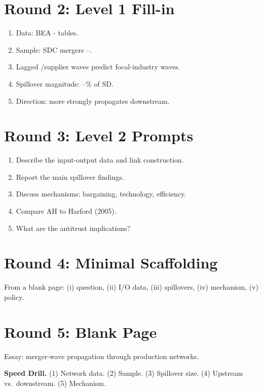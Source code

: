 \documentclass[11pt]{article}
\newcommand{\blank}[1]{\underline{\hspace{#1}}}
\begin{document}
\section*{Round 2: Level 1 Fill-in}
\begin{enumerate}
\item Data: BEA \blank{1cm}-\blank{1cm} tables.
\item Sample: SDC mergers \blank{1cm}--\blank{1cm}.
\item Lagged \blank{2cm}/supplier waves predict focal-industry waves.
\item Spillover magnitude: \blank{1cm}--\blank{1cm}\% of SD.
\item Direction: \blank{2cm} more strongly propagates downstream.
\end{enumerate}

\section*{Round 3: Level 2 Prompts}
\begin{enumerate}
\item Describe the input-output data and link construction.
\item Report the main spillover findings.
\item Discuss mechanisms: bargaining, technology, efficiency.
\item Compare AH to Harford (2005).
\item What are the antitrust implications?
\end{enumerate}

\section*{Round 4: Minimal Scaffolding}
From a blank page: (i) question, (ii) I/O data, (iii) spillovers, (iv) mechanism, (v) policy.

\section*{Round 5: Blank Page}
Essay: merger-wave propagation through production networks.

\vspace{6pt}
\begin{drillbox}
\textbf{Speed Drill.} (1) Network data. (2) Sample. (3) Spillover size. (4) Upstream vs.\ downstream. (5) Mechanism.
\end{drillbox}
\end{document}
